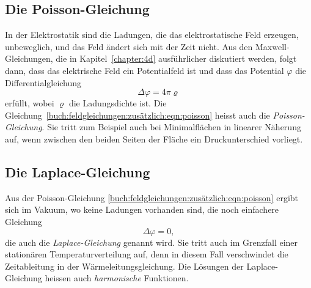 \subsection{Die Poisson-Gleichung}
In der Elektrostatik sind die Ladungen, die das elektrostatische
Feld erzeugen, unbeweglich, und das Feld ändert sich mit der Zeit
nicht.
Aus den Maxwell-Gleichungen, die in Kapitel~\ref{chapter:4d}
ausführlicher diskutiert werden, folgt dann, dass das elektrische
Feld ein Potentialfeld ist und dass das Potential $\varphi$ die
Differentialgleichung
\begin{equation}
\Delta \varphi = 4\pi \varrho
\label{buch:feldgleichungen:zusätzlich:eqn:poisson}
\end{equation}
erfüllt, wobei $\varrho$ die Ladungsdichte ist.
Die Gleichung~\eqref{buch:feldgleichungen:zusätzlich:eqn:poisson}
heisst auch die {\em Poisson-Gleichung}.
%
Sie tritt zum Beispiel auch bei Minimalflächen in linearer Näherung
auf, wenn zwischen den beiden Seiten der Fläche ein Druckunterschied
vorliegt.

\subsection{Die Laplace-Gleichung}
Aus der Poisson-Gleichung \eqref{buch:feldgleichungen:zusätzlich:eqn:poisson}
ergibt sich im Vakuum, wo keine Ladungen vorhanden sind, die noch
einfachere Gleichung
\[
\Delta \varphi = 0,
\]
die auch die {\em Laplace-Gleichung} genannt wird.
%
Sie tritt auch im Grenzfall einer stationären Temperaturverteilung
auf, denn in diesem Fall verschwindet die Zeitableitung in der
Wärmeleitungsgleichung.
Die Lösungen der Laplace-Gleichung heissen auch {\em harmonische} 
Funktionen.


